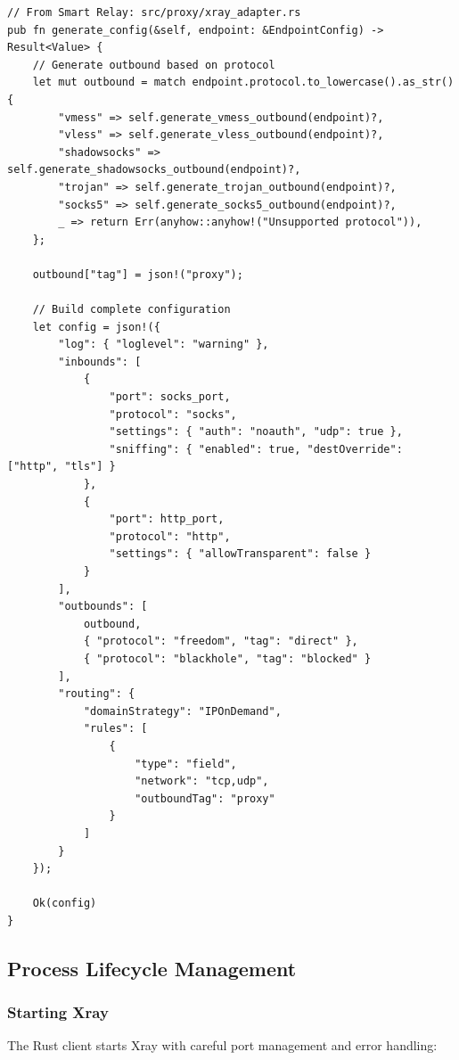 \begin{verbatim}
// From Smart Relay: src/proxy/xray_adapter.rs
pub fn generate_config(&self, endpoint: &EndpointConfig) -> Result<Value> {
    // Generate outbound based on protocol
    let mut outbound = match endpoint.protocol.to_lowercase().as_str() {
        "vmess" => self.generate_vmess_outbound(endpoint)?,
        "vless" => self.generate_vless_outbound(endpoint)?,
        "shadowsocks" => self.generate_shadowsocks_outbound(endpoint)?,
        "trojan" => self.generate_trojan_outbound(endpoint)?,
        "socks5" => self.generate_socks5_outbound(endpoint)?,
        _ => return Err(anyhow::anyhow!("Unsupported protocol")),
    };
    
    outbound["tag"] = json!("proxy");
    
    // Build complete configuration
    let config = json!({
        "log": { "loglevel": "warning" },
        "inbounds": [
            {
                "port": socks_port,
                "protocol": "socks",
                "settings": { "auth": "noauth", "udp": true },
                "sniffing": { "enabled": true, "destOverride": ["http", "tls"] }
            },
            {
                "port": http_port,
                "protocol": "http",
                "settings": { "allowTransparent": false }
            }
        ],
        "outbounds": [
            outbound,
            { "protocol": "freedom", "tag": "direct" },
            { "protocol": "blackhole", "tag": "blocked" }
        ],
        "routing": {
            "domainStrategy": "IPOnDemand",
            "rules": [
                {
                    "type": "field",
                    "network": "tcp,udp",
                    "outboundTag": "proxy"
                }
            ]
        }
    });
    
    Ok(config)
}
\end{verbatim}

\subsection{Process Lifecycle Management}

\subsubsection{Starting Xray}

The Rust client starts Xray with careful port management and error handling:

